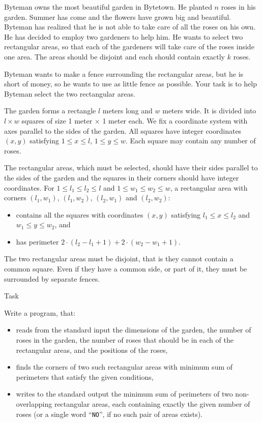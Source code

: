 Byteman owns the most beautiful garden in Bytetown. He planted $n$ roses in his garden. Summer has come and the flowers have grown big and beautiful. Byteman has realized that he is not able to take care of all the roses on his own. He has decided to employ two gardeners to help him. He wants to select two rectangular areas, so that each of the gardeners will take care of the roses inside one area. The areas should be disjoint and each should contain exactly $k$ roses.

Byteman wants to make a fence surrounding the rectangular areas, but he is short of money, so he wants to use as little fence as possible. Your task is to help Byteman select the two rectangular areas.

The garden forms a rectangle $l$ meters long and $w$ meters wide. It is divided into $l \times w$ squares of size
1 meter $\times$ 1 meter each. We fix a coordinate system with axes parallel to the sides of the garden. All squares
have integer coordinates $(x, y)$ satisfying $1 \le x \le l$, $1 \le y \le w$. Each square may contain any number of roses.

The rectangular areas, which must be selected, should have their sides parallel to the sides of the garden
and the squares in their corners should have integer coordinates. For $1 \le l_1 \le l_2 \le l$ and $1 \le w_1 \le w_2 \le w$, a
rectangular area with corners $(l_1,w_1)$, $(l_1,w_2)$, $(l_2,w_1)$ and $(l_2,w_2)$:

\begin{itemize}
\item contains all the squares with coordinates $(x, y)$ satisfying $l_1 \le x \le l_2$ and $w_1 \le y \le w_2$, and

\item has perimeter $2 \cdot (l_2 -l_1 +1)+2 \cdot (w_2-w_1 +1)$.
\end{itemize}

The two rectangular areas must be disjoint, that is they cannot contain a common square. Even if they have a
common side, or part of it, they must be surrounded by separate fences.

Task

Write a program, that:

\begin{itemize}
\item reads from the standard input the dimensions of the garden, the number of roses in the garden, the
number of roses that should be in each of the rectangular areas, and the positions of the roses,

\item finds the corners of two such rectangular areas with minimum sum of perimeters that satisfy the given
conditions,

\item writes to the standard output the minimum sum of perimeters of two non-overlapping rectangular areas,
each containing exactly the given number of roses (or a single word ``\texttt{NO}'', if no such pair of areas exists).
\end{itemize}